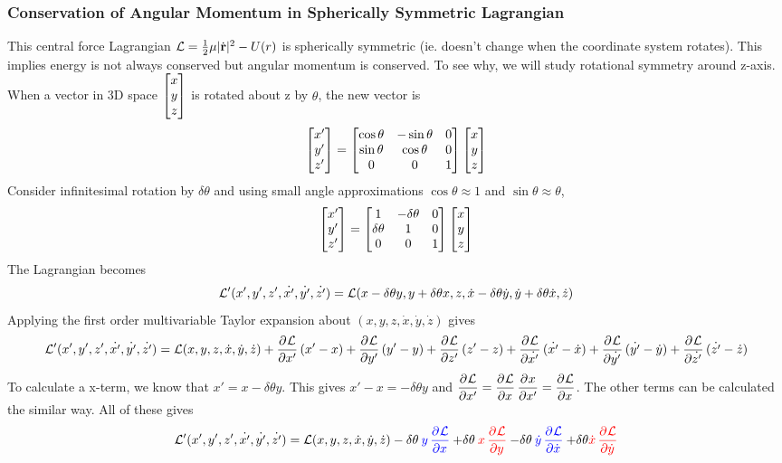 \subsubsection{Conservation of Angular Momentum in Spherically Symmetric Lagrangian}
This central force Lagrangian $\mathcal{L}=\frac12 \mu |\dot{\mathbf{r}}|^2-U(r)$ is spherically symmetric (ie. doesn't change when the coordinate system rotates). This implies energy is not always conserved but angular momentum is conserved. To see why, we will study rotational symmetry around z-axis.
When a vector in 3D space $\begin{bmatrix}x \\ y \\ z\end{bmatrix}$ is rotated about z by $\theta$, the new vector is
\[\begin{bmatrix}x' \\ y' \\ z'\end{bmatrix}=\begin{bmatrix}\cos\theta & -\sin\theta & 0 \\ \sin\theta & \cos\theta & 0 \\ 0 & 0 & 1\end{bmatrix}\begin{bmatrix}x \\ y \\ z\end{bmatrix}\]
Consider infinitesimal rotation by $\delta\theta$ and using small angle approximations $\cos\theta\approx1$ and $\sin\theta\approx\theta$,
\[\begin{bmatrix}x' \\ y' \\ z'\end{bmatrix}=\begin{bmatrix}1 & -\delta\theta & 0 \\ \delta\theta & 1 & 0 \\ 0 & 0 & 1\end{bmatrix}\begin{bmatrix}x \\ y \\ z\end{bmatrix}\]
The Lagrangian becomes
\[\mathcal{L}'(x',y',z',\dot{x'},\dot{y'},\dot{z'})=\mathcal{L}(x-\delta\theta y,y+\delta\theta x,z,\dot{x}-\delta\theta \dot{y},\dot{y}+\delta\theta \dot{x},\dot{z})\]
Applying the first order multivariable Taylor expansion about $(x,y,z,\dot{x},\dot{y},\dot{z})$ gives
\[\LL'(x',y',z',\dot{x'},\dot{y'},\dot{z'})=\LL(x,y,z,\dot{x},\dot{y},\dot{z})+\dpd{\LL}{x'}(x'-x)+\dpd{\LL}{y'}(y'-y)+\dpd{\LL}{z'}(z'-z)+\dpd{\LL}{\dot{x'}}(\dot{x'}-\dot{x})+\dpd{\LL}{\dot{y'}}(\dot{y'}-\dot{y})+\dpd{\LL}{\dot{z'}}(\dot{z'}-\dot{z})\]
To calculate a x-term, we know that $x'=x-\delta\theta y$. This gives $x'-x=-\delta\theta y$ and $\dpd{\LL}{x'}=\dpd{\LL}{x}\dpd{x}{x'}=\dpd{\LL}{x}$. The other terms can be calculated the similar way. All of these gives
\[\LL'(x',y',z',\dot{x'},\dot{y'},\dot{z'})=\LL(x,y,z,\dot{x},\dot{y},\dot{z})-\delta\theta \mathbin{\textcolor{blue}{y\dpd{\LL}{x}}}+\delta\theta \mathbin{\textcolor{red}{x\dpd{\LL}{y}}}-\delta\theta \mathbin{\textcolor{blue}{\dot{y}\dpd{\LL}{\dot{x}}}}+\delta\theta\mathbin{\textcolor{red}{\dot{x}\dpd{\LL}{\dot{y}}}}\]
